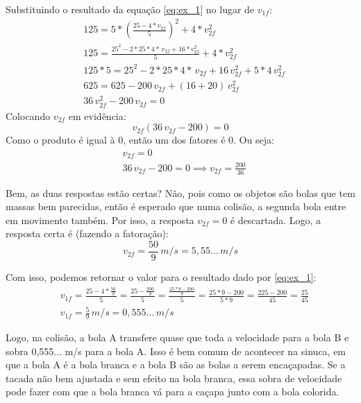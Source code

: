 \documentclass[12pt]{extarticle}
\newcommand{\<}{\langle}
\renewcommand{\>}{\rangle}
\theoremstyle{definition}
\begin{document}
Substituindo o resultado da equação \ref{eq:ex_1} no lugar de $v_{1f}$:
\begin{equation}
    \begin{split}
        &125= 5*\left(\frac{25 - 4*v_{2f}}{5}\right)^2 + 4*v_{2f}^2\\
        &125= \frac{25^2 - 2*25*4*\,v_{2f} + 16*v_{2f}^2}{5} + 4*v_{2f}^2\\
        & 125*5 = 25^2 - 2*25*4*\,v_{2f} + 16\,v_{2f}^2 + 5*4\,v_{2f}^2\\
        &625 = 625-200\,v_{2f} + (16+20)\,v_{2f}^2\\
        &36\,v_{2f}^2 - 200\,v_{2f} =0
    \end{split}
\end{equation}
Colocando $v_{2f}$ em evidência:
\begin{equation}
        v_{2f}\left(36\,v_{2f} - 200\right) =0
\end{equation}
Como o produto é igual à 0, então um dos fatores é 0. Ou seja:
\begin{equation}
    \begin{split}
        &v_{2f} =0\\
        &36\,v_{2f} - 200=0 \implies v_{2f} = \frac{200}{36}
    \end{split}
\end{equation}

Bem, as duas respostas estão certas? Não, pois como os objetos são bolas que tem massas bem parecidas, então é esperado que numa colisão, a segunda bola entre em movimento também. Por isso, a resposta $v_{2f}=0$ é descartada. Logo, a resposta certa é (fazendo a fatoração):
\begin{equation}
    \boxed{v_{2f} = \frac{50}{9}\, m/s = 5,55...\, m/s}
\end{equation}

Com isso, podemos retornar o valor para o resultado dado por \ref{eq:ex_1}:
\begin{equation}
    \begin{split}
            &v_{1f} = \frac{25 - 4*\frac{50}{9}}{5} = \frac{25 - \frac{200}{9}}{5} = \frac{\frac{25*9 - 200}{9}}{5} = \frac{25*9 -200}{5*9} = \frac{225-200}{45}=\frac{25}{45}\\
            &\boxed{v_{1f} = \frac{5}{9}\, m/s = 0,555...\,m/s}
    \end{split}
\end{equation}

Logo, na colisão, a bola A transfere quase que toda a velocidade para a bola B e sobra 0,555... m/s para a bola A. Isso é bem comum de acontecer na sinuca, em que a bola A é a bola branca e a bola B são as bolas a serem encaçapadas. Se a tacada não bem ajustada e sem efeito na bola branca, essa sobra de velocidade pode fazer com que a bola branca vá para a caçapa junto com a bola colorida.
\end{document}
